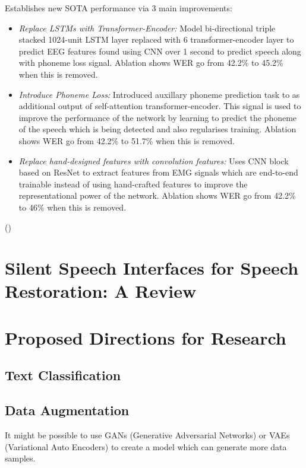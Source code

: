 Establishes new SOTA performance via 3 main improvements:

\begin{itemize}
  \item \emph{Replace LSTMs with Transformer-Encoder:}
  Model bi-directional triple stacked 1024-unit LSTM layer replaced with 6 transformer-encoder
  layer to predict EEG features found using CNN over 1 second to predict speech along with
  phoneme loss signal.
  Ablation shows WER go from 42.2\% to 45.2\% when this is removed.
  \item \emph{Introduce Phoneme Loss:}
  Introduced auxillary phoneme prediction task to as additional 
  output of self-attention transformer-encoder. This signal is used to improve the performance
  of the network by learning to predict the phoneme of the speech which is being detected and
  also regularises training.
  Ablation shows WER go from 42.2\% to 51.7\% when this is removed.
  \item \emph{Replace hand-designed features with convolution features:}
  Uses CNN block based on ResNet to extract features from EMG signals which are end-to-end
  trainable instead of using hand-crafted features to improve the representational power of the network.
  Ablation shows WER go from 42.2\% to 46\% when this is removed.
\end{itemize}

(\cite{gaddy2021improved})

\section{Silent Speech Interfaces for Speech Restoration: A Review}

\section{Proposed Directions for Research}

\subsection{Text Classification}

\subsection{Data Augmentation}

It might be possible to use GANs (Generative Adversarial Networks) or
VAEs (Variational Auto Encoders) to create a model which can generate
more data samples.


